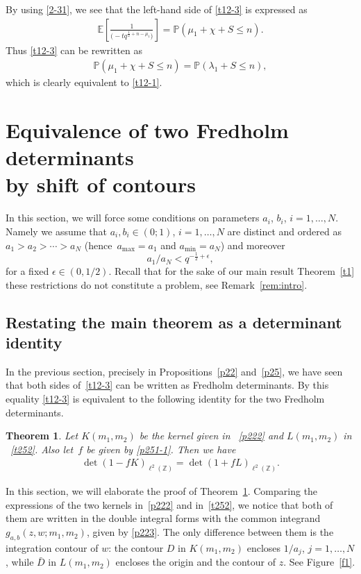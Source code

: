 \documentclass[pdftex]{sigma}
\numberwithin{equation}{section}
\newtheorem{Theorem}{Theorem}[section]
\newcommand{\E}[1]{\widetilde{e}_{#1}}
\def\e{\epsilon}
\def\E{\mathbb{E}}
\def\l{\lambda}
\def\P{\mathbb{P}}
\def\Z{\mathbb{Z}}
\begin{document}
 By using \eqref{2-31}, we see that
 the left-hand side of \eqref{t12-3}
 is expressed as
 \begin{align*}
 \E
 \left[ \frac{1}{\bigl(-t q^{\frac12+n-\mu_1}\bigr)}\right]
 =\P(\mu_1+\chi+S\le n).
 \end{align*}
 Thus \eqref{t12-3} can be rewritten as
 \begin{align*}%
 \P(\mu_1+\chi+S\le n)
 =
 \P(\l_1+S\le n),
 \end{align*}
 which is clearly equivalent to \eqref{t12-1}.

\section[Equivalence of two Fredholm determinants by shift of contours]{Equivalence of two Fredholm determinants\\ by shift of contours} \label{s3}

In this section, we will force some conditions on parameters $a_i$, $b_i$,
$i=1,\dots,N$. Namely we assume that $a_i,b_i\in (0;1)$, $i=1,\dots,N $ are distinct and ordered as $a_1>a_2>\cdots > a_N$ (hence~${a_{\max}=a_1}$ and $a_{\min}=a_N$)
and moreover
\[
 a_{1}/a_{N}<q^{-\frac12+\e},
\]
for a fixed $\e \in (0,1/2)$. Recall that for the sake of our main result Theorem~\ref{t1} these restrictions do not constitute a problem, see Remark~\ref{rem:intro}.


\subsection{Restating the main theorem as a determinant identity}
\label{s31}
In the previous section, precisely in Propositions~\ref{p22} and~\ref{p25}, we have seen that both sides of~\eqref{t12-3} can be written as Fredholm determinants. By this equality \eqref{t12-3} is equivalent to the following identity for the two Fredholm determinants.
\begin{Theorem}
\label{t31}
Let $K(m_1,m_2)$ be the kernel given in ~\eqref{p222} and $L(m_1,m_2)$ in ~\eqref{t252}.
Also let~$f$ be given by \eqref{p251-1}.
Then we have
\begin{align}
\label{31}
\det(1-f K)_{\ell^2(\Z)}
=
\det(1+fL)_{\ell^2(\Z)}.
\end{align}
\end{Theorem}
In this section, we will elaborate the proof of Theorem~\ref{t31}.
Comparing the expressions of the two kernels in~\eqref{p222} and in~\eqref{t252}, we notice that both of them are written in the double integral forms with the common integrand $g_{a,b}(z,w;m_1,m_2)$, given by \eqref{p223}. The only difference between them is the integration contour of $w$: the contour $D$ in $K(m_1,m_2)$ encloses $1/a_j$, $j=1,\dots,N$, while $\bar{D}$ in $L(m_1,m_2)$ encloses the origin and the contour of $z$. See Figure~\ref{f1}.
\end{document}
